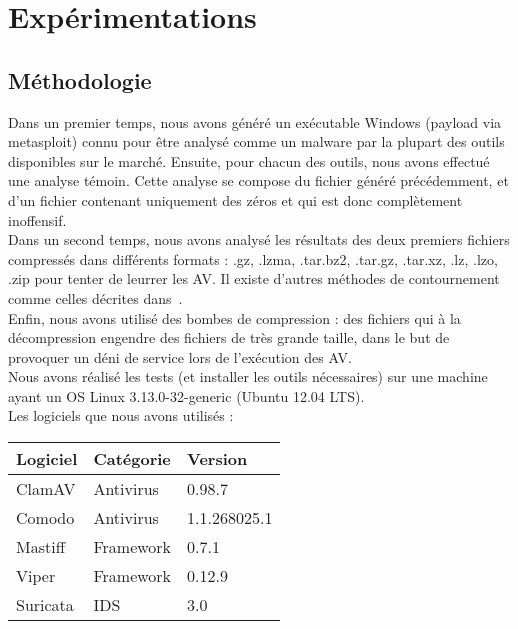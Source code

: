 \documentclass[smallextended]{svjour3}       %
\begin{document}
\section{Expérimentations}
\label{3.expérimentations}

\subsection{Méthodologie}
\label{3.1méthodologie}
Dans un premier temps, nous avons généré un exécutable Windows (payload via metasploit) connu pour être analysé comme un malware par la plupart des outils disponibles sur le marché. Ensuite, pour chacun des outils, nous avons effectué une analyse témoin. Cette analyse se compose du fichier généré précédemment, et d'un fichier contenant uniquement des zéros et qui est donc complètement inoffensif.\\
Dans un second temps, nous avons analysé les résultats des deux premiers fichiers compressés dans différents formats : .gz, .lzma, .tar.bz2, .tar.gz, .tar.xz, .lz, .lzo, .zip pour tenter de leurrer les AV. Il existe d'autres méthodes de contournement comme celles décrites dans~\cite{Contournement}.\\
Enfin, nous avons utilisé des bombes de compression : des fichiers qui à la décompression engendre des fichiers de très grande taille, dans le but de provoquer un déni de service lors de l'exécution des AV.\\
$ $\\
Nous avons réalisé les tests (et installer les outils nécessaires) sur une machine ayant un OS Linux 3.13.0-32-generic (Ubuntu 12.04 LTS).\\
Les logiciels que nous avons utilisés :\\
\begin{tabular}{|l|l|l|}
    \hline
     \textbf{Logiciel} & \textbf{Catégorie} & \textbf{Version}\\
    \hline
    ClamAV & Antivirus & 0.98.7\\ 			
    \hline
    Comodo & Antivirus & 1.1.268025.1\\
    \hline
    \hline
    Mastiff & Framework & 0.7.1\\
    \hline
    Viper & Framework & 0.12.9\\
    \hline
    \hline
    Suricata & IDS & 3.0\\
    \hline
 \end{tabular}
\end{document}
